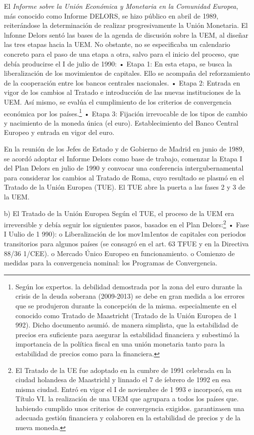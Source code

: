 \documentclass[10pt,a4paper]{article}
\begin{document}
El \textit{Informe sobre la Unión Económica y Monetaria en la Comunidad Europea}, más conocido como Informe DELORS, se hizo público en abril de 1989, reiterándose la determinación de realizar progresivamente la Unión Monetaria. El lnfonne Delors sentó las bases de la agenda de discusión sobre la UEM, al diseñar las tres etapas hacia la UEM. No obstante, no se especificaba un calendario concreto para el paso de una etapa a otra, salvo para el inicio del proceso, que debía producirse el I de julio de 1990: 
• Etapa 1: En esta etapa, se busca la liberalización de los movimientos de capitales. Ello se acompaña del reforzamiento de la cooperación entre los bancos centrales nacionales. 
• Etapa 2: Entrada en vigor de los cambios al Tratado e introducción de las nuevas instituciones de la UEM. Así mismo, se evalúa el cumplimiento de los criterios de convergencia económica por los países.\footnote{%
    Según los expertos. la debilidad demostrada por la zona del euro durante la crisis de la deuda soberana (2009-2013) se debe en gran medida a los errores que se produjeron durante la concepción de la misma. especialmente en el conocido como Tratado de Maastricht (Tratado de la Unión Europea de 1 992). Dicho documento asumió. de manera simplista, que la estabilidad de precios era suficiente para asegurar la estabilidad financiera y subestimó la importancia de la política fiscal en una unión monetaria tanto para la estabilidad de precios como para la financiera.
} 
• Etapa 3: Fijación irrevocable de los tipos de cambio y nacimiento de la moneda única (el euro). Establecimiento del Banco Central Europeo y entrada en vigor del  euro.

En la reunión de los Jefes de Estado y de Gobierno de Madrid en junio de 1989, se acordó adoptar el Informe Delors como base de trabajo, comenzar la Etapa I del Plan Delors en julio de 1990 y convocar una conferencia intergubernamental para considerar los cambios al Tratado de Roma, cuyo resultado se plasmó en el Tratado de la Unión Europea (TUE). El TUE abre la puerta a las fases 2 y 3 de la UEM.

b) El Tratado de la Unión Europea 
Según el TUE, el proceso de la UEM era irreversible y debía seguir los siguientes pasos, basados en el Plan Delors:\footnote{%
    El Tratado de la UE fue adoptado en la cumbre de 1991 celebrada en la ciudad holandesa de Maastrichl y linnado el 7 de íebrero de 1992 en esa misma ciudad. Entró en vigor el I de noviembre de 1 993 e incorporó, en su Título VI. la realización de una UEM que agrupara a todos los países que. habiendo cumplido unos criterios de convergencia exigidos. garantizasen una adecuada gestión financiera y colaboren en la estabilidad de precios y de la nueva moneda.
}
• Fase I Uulio de 1 990): o Liberalización de los mov1m1entos de capitales con periodos transitorios para algunos países (se consagró en el art. 63 TFUE y en la Directiva 88/36 1/CEE). o Mercado Único Europeo en funcionamiento. o Comienzo de medidas para la convergencia nominal: los Programas de Convergencia.
\end{document}
